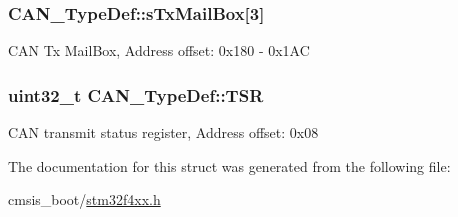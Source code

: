 \subsubsection[{\texorpdfstring{s\+Tx\+Mail\+Box}{sTxMailBox}}]{ C\+A\+N\+\_\+\+Type\+Def\+::s\+Tx\+Mail\+Box\mbox{[}3\mbox{]}}\hypertarget{struct_c_a_n___type_def_a328925e230f68a775f6f4ad1076c27ce}{}\label{struct_c_a_n___type_def_a328925e230f68a775f6f4ad1076c27ce}
C\+AN Tx Mail\+Box, Address offset\+: 0x180 -\/ 0x1\+AC 
\subsubsection[{\texorpdfstring{T\+SR}{TSR}}]{ uint32\+\_\+t C\+A\+N\+\_\+\+Type\+Def\+::\+T\+SR}\hypertarget{struct_c_a_n___type_def_acbc82ac4e87e75350fc586be5e56d95b}{}\label{struct_c_a_n___type_def_acbc82ac4e87e75350fc586be5e56d95b}
C\+AN transmit status register, Address offset\+: 0x08 

The documentation for this struct was generated from the following file\+:\begin{DoxyCompactItemize}
\item 
cmsis\+\_\+boot/\hyperlink{stm32f4xx_8h}{stm32f4xx.\+h}\end{DoxyCompactItemize}

